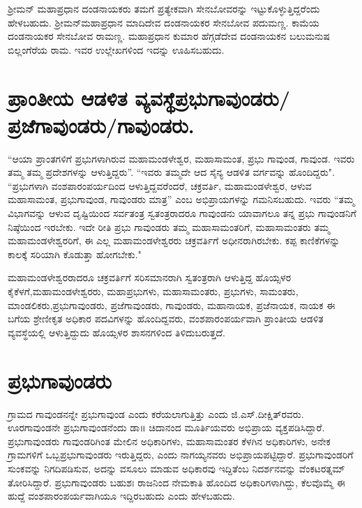 ಶ‍್ರೀಮನ್​ ಮಹಾಪ್ರಧಾನ ದಂಡನಾಯಕರು ತಮಗೆ ಪ್ರತ್ಯೇಕವಾಗಿ ಸೇನಬೋವರನ್ನು ಇಟ್ಟುಕೊಳ್ಳುತ್ತಿದ್ದರೆಂದು ಹೇಳ\-ಬಹುದು. ಶ‍್ರೀಮನ್​ಮಹಾಪ್ರಧಾನ ಮಾದಿದೇವ ದಂಡನಾಯಕರ ಸೇನಬೋವ ಪದುಮಣ್ಣ. ಕಾಮೆಯ ದಂಡನಾಯಕರ ಸೇನಬೋವ ರಾಮಣ್ಣ. ಮಹಾಪ್ರಧಾನ ಕುಮಾರ ಹೆಗ್ಗಡೆದೇವ ದಂಡನಾಯಕನ ಬಲುಮನುಷ ಬಿಲ್ಲಂಗೆರೆಯ ರಾಮ. ಇವರ ಉಲ್ಲೇಖಗಳಿಂದ ಇದನ್ನು ಊಹಿಸಬಹುದು.


\section*{ಪ್ರಾಂತೀಯ ಆಡಳಿತ ವ್ಯವಸ್ಥೆ\enginline{--}ಪ್ರಭುಗಾವುಂಡರು/ಪ್ರಜೆಗಾವುಂಡರು/ಗಾವುಂಡರು.}

“ಆಯಾ ಪ್ರಾಂತಗಳಿಗೆ ಪ್ರಭುಗಳಾಗಿರುವ ಮಹಾಮಂಡಳೇಶ್ವರ, ಮಹಾಸಾಮಂತ, ಪ್ರಭು ಗಾವುಂಡ, ಗಾವುಂಡ. ಇವರು ತಮ್ಮ ತಮ್ಮ ಪ್ರದೇಶಗಳನ್ನು ಆಳುತ್ತಿದ್ದರು”. “ಇವರು ತಮ್ಮದೇ ಆದ ಸೈನ್ಯ ಆಡಳಿತ ವರ್ಗವನ್ನು ಹೊಂದಿದ್ದರು". “ಪ್ರಭುಗಳಾಗಿ ವಂಶಪಾರಂಪರ್ಯದಿಂದ ಆಳುತ್ತಿದ್ದವರೆಂದರೆ, ಚಕ್ರವರ್ತಿ, ಮಹಾಮಂಡಳೇಶ್ವರ, ಆಳುವ ಮಹಾಸಾಮಂತ, ಪ್ರಭುಗಾವುಂಡ, ಗಾವುಂಡರು ಮಾತ್ರ” ಎಂಬ ಅಭಿಪ್ರಾಯಗಳನ್ನು ಗಮನಿಸಬಹುದು. ಇವರು “ತಮ್ಮ ವಿಭಾಗವನ್ನು ಆಳುವ ದೃಷ್ಟಿಯಿಂದ ಸರ್ವತಂತ್ರ ಸ್ವತಂತ್ರರಾದರೂ ಗಾವುಂಡನು ಯಾವಾಗಲೂ ತನ್ನ ಪ್ರಭು ಗಾವುಂಡನಿಗೆ ನಿಷ್ಠೆಯಿಂದ ಇರಬೇಕು. ಇದೇ ರೀತಿ ಪ್ರಭು ಗಾವುಂಡರು ತಮ್ಮ ಮಹಾಸಾಮಂತರಿಗೆ, ಮಹಾಸಾಮಂತರು ತಮ್ಮ ಮಹಾಮಂಡಳೇಶ್ವರ\-ರಿಗೆ, ಈ ಎಲ್ಲ ಮಹಾಮಂಡಳೇಶ್ವರರು ಚಕ್ರವರ್ತಿಗೆ ಅಧೀನರಾಗಿರಬೇಕು. ಕಪ್ಪ ಕಾಣಿಕೆಗಳನ್ನು ಕಾಲಕ್ಕೆ ಸರಿಯಾಗಿ ಕೊಡುತ್ತಾ ಹೋಗಬೇಕು."

ಮಹಾಮಂಡಳೇಶ್ವರರಾದರೂ ಚಕ್ರವರ್ತಿಗೆ ಸರಿಸಮಾನರಾಗಿ ಸ್ವತಂತ್ರರಾಗಿ ಆಳುತ್ತಿದ್ದ ಹೊಯ್ಸಳರ ಕೈಕೆಳಗೆ,\break ಮಹಾಮಂಡಳೇಶ್ವರರು, ಮಹಾಪ್ರಭುಗಳು, ಮಹಾಸಾಮಂತರು, ಪ್ರಭುಗಳು, ಸಾಮಂತರು, ಮಾಂಡಲಿಕರು,\break ಪ್ರಭುಗಾವುಂಡರು, ಪ್ರಜೆಗಾವುಂಡರು, ಗಾವುಂಡರು, ಮಹಾನಾಯಕ, ಪ್ರಜೆನಾಯಕ, ನಾಯಕ ಈ ಬಗೆಯ ಶ್ರೇಣೀಕೃತ ಅಧಿಕಾರ ಪದವಿಗಳನ್ನು ಹೊಂದಿದ್ದವರು, ವಂಶಪಾರಂಪರ್ಯವಾಗಿ ಪ್ರಾಂತೀಯ ಆಡಳಿತ ವ್ಯವಸ್ಥೆಯಲ್ಲಿ ಆಳುತ್ತಿದ್ದುದು ಹೊಯ್ಸಳರ ಶಾಸನಗಳಿಂದ ತಿಳಿದುಬರುತ್ತದೆ.


\section*{ಪ್ರಭುಗಾವುಂಡರು}

ಗ್ರಾಮದ ಗಾವುಂಡನನ್ನೇ ಪ್ರಭುಗಾವುಂಡ ಎಂದು ಕರೆಯಲಾಗುತ್ತಿತ್ತು ಎಂದು ಜಿ.ಎಸ್​.ದೀಕ್ಷಿತ್​ರವರು. ಊರಗಾವುಂಡನೇ ಪ್ರಭುಗಾವುಂಡನೆಂದು ಡಾ॥ ಚಿದಾನಂದ ಮೂರ್ತಿಯವರು ಅಭಿಪ್ರಾಯ ವ್ಯಕ್ತಪಡಿಸಿದ್ದಾರೆ. ಪ್ರಭುಗಾವುಂಡರು ಗಾವುಂಡರಿಗಿಂತ ಮೇಲಿನ ಅಧಿಕಾರಿಗಳು, ಮಹಾಸಾಮಂತರ ಕೆಳಗಿನ ಅಧಿಕಾರಿಗಳು, ಅನೇಕ ಗ್ರಾಮಗಳಿಗೆ ಒಬ್ಬ\break ಪ್ರಭುಗಾವುಂಡರು ಇರುತ್ತಿದ್ದರು, ಎಂದು ನಾಗಯ್ಯನವರು ಅಭಿಪ್ರಾಯಪಟ್ಟಿದ್ದಾರೆ. ಪ್ರಭುಗಾವುಂಡರಿಗೆ ಸುಂಕವನ್ನು ನಿಗದಿಪಡಿಸುವ, ಅದನ್ನು ವಸೂಲು ಮಾಡುವ ಅಧಿಕಾರವು ಇದ್ದಿತೆಂಬ ನಿದರ್ಶನವನ್ನು ವೆಂಕಟರತ್ನಮ್ ತೋರಿಸಿದ್ದಾರೆ. ಪ್ರಭುಗಾವುಂಡರು ಬಹುಶಃ ರಾಜನಿಂದ ನೇಮಕಾತಿ ಹೊಂದಿದ ಅಧಿಕಾರಿಗಳಾಗಿದ್ದು, ಕೆಲವೊಮ್ಮೆ ಈ ಹುದ್ದೆ ವಂಶಪಾರಂಪರ್ಯ\-ವಾಗಿಯೂ ಇದ್ದಿರಬಹುದು ಎಂದು ಹೇಳಬಹುದು.

